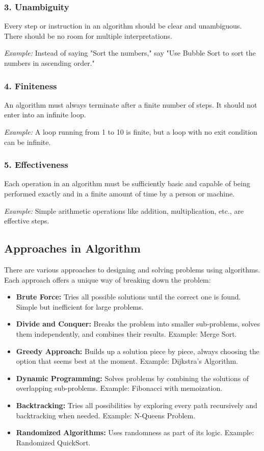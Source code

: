 \subsubsection*{\textbf{3. Unambiguity}}
Every step or instruction in an algorithm should be clear and unambiguous. There should be no room for multiple interpretations.

\textit{Example:} Instead of saying "Sort the numbers," say "Use Bubble Sort to sort the numbers in ascending order."

\subsubsection*{\textbf{4. Finiteness}}
An algorithm must always terminate after a finite number of steps. It should not enter into an infinite loop.

\textit{Example:} A loop running from 1 to 10 is finite, but a loop with no exit condition can be infinite.

\subsubsection*{\textbf{5. Effectiveness}}
Each operation in an algorithm must be sufficiently basic and capable of being performed exactly and in a finite amount of time by a person or machine.

\textit{Example:} Simple arithmetic operations like addition, multiplication, etc., are effective steps.

\subsection*{\large \textbf{Approaches in Algorithm}}

There are various approaches to designing and solving problems using algorithms. Each approach offers a unique way of breaking down the problem:

\begin{itemize}
  \item \textbf{Brute Force:} Tries all possible solutions until the correct one is found. Simple but inefficient for large problems.
  \item \textbf{Divide and Conquer:} Breaks the problem into smaller sub-problems, solves them independently, and combines their results. Example: Merge Sort.
  \item \textbf{Greedy Approach:} Builds up a solution piece by piece, always choosing the option that seems best at the moment. Example: Dijkstra’s Algorithm.
  \item \textbf{Dynamic Programming:} Solves problems by combining the solutions of overlapping sub-problems. Example: Fibonacci with memoization.
  \item \textbf{Backtracking:} Tries all possibilities by exploring every path recursively and backtracking when needed. Example: N-Queens Problem.
  \item \textbf{Randomized Algorithms:} Uses randomness as part of its logic. Example: Randomized QuickSort.
\end{itemize}

